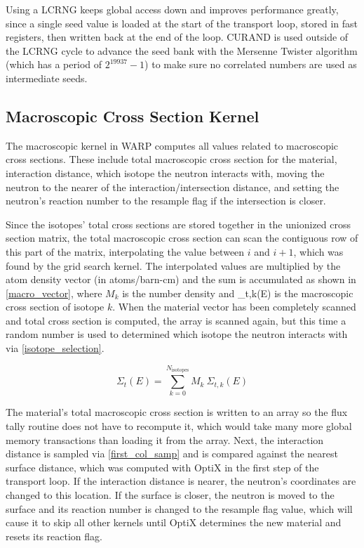 Using a LCRNG keeps global access down and improves performance greatly, since a single seed value is loaded at the start of the transport loop, stored in fast registers, then written back at the end of the loop.  CURAND is used outside of the LCRNG cycle to advance the seed bank with the Mersenne Twister algorithm (which has a period of $2^{19937} - 1$) to make sure no correlated numbers are used as intermediate seeds.

\subsection{Macroscopic Cross Section Kernel}

The macroscopic kernel in WARP computes all values related to macroscopic cross sections.  These include total macroscopic cross section for the material, interaction distance, which isotope the neutron interacts with, moving the neutron to the nearer of the interaction/intersection distance, and setting the neutron's reaction number to the resample flag if the intersection is closer.  

Since the isotopes' total cross sections are stored together in the unionized cross section matrix, the total macroscopic cross section can scan the contiguous row of this part of the matrix, interpolating the value between $i$ and $i+1$, which was found by the grid search kernel.  The interpolated values are multiplied by the atom density vector (in atoms/barn-cm) and the sum is accumulated as shown in \eqref{macro_vector}, where $M_k$ is the number density and \Sigma_{t,k}(E) is the macroscopic cross section of isotope $k$.  When the material vector has been completely scanned and total cross section is computed, the array is scanned again, but this time a random number is used to determined which isotope the neutron interacts with via \eqref{isotope_selection}.

\begin{equation}
\Sigma_t(E) = \sum_{k=0}^{N_\mathrm{isotopes}} M_k \: \Sigma_{t,k}(E)
\label{macro_vector}
\end{equation}

The material's total macroscopic cross section is written to an array so the flux tally routine does not have to recompute it, which would take many more global memory transactions than loading it from the array. %
 Next, the interaction distance is sampled via \eqref{first_col_samp} and is compared against the nearest surface distance, which was computed with OptiX in the first step of the transport loop.  If the interaction distance is nearer, the neutron's coordinates are changed to this location.  If the surface is closer, the neutron is moved to the surface and its reaction number is changed to the resample flag value, which will cause it to skip all other kernels until OptiX determines the new material and resets its reaction flag.


